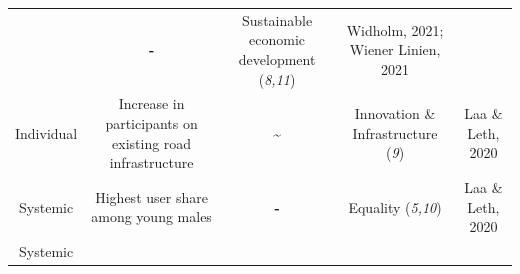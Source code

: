 \documentclass[
]{book}
\begin{document}
\begin{longtable}[]{@{}ccccc@{}}
\begin{minipage}[t]{0.16\columnwidth}
\end{minipage} & \begin{minipage}[t]{0.17\columnwidth}\centering
\textbf{-}\strut
\end{minipage} & \begin{minipage}[t]{0.17\columnwidth}\centering
Sustainable economic development (\emph{8,11})\strut
\end{minipage} & \begin{minipage}[t]{0.17\columnwidth}\centering
Widholm, 2021; Wiener Linien, 2021\strut
\end{minipage}\tabularnewline
\begin{minipage}[t]{0.17\columnwidth}\centering
Individual\strut
\end{minipage} & \begin{minipage}[t]{0.16\columnwidth}\centering
Increase in participants on existing road infrastructure\strut
\end{minipage} & \begin{minipage}[t]{0.17\columnwidth}\centering
\textbf{\textasciitilde{}}\strut
\end{minipage} & \begin{minipage}[t]{0.17\columnwidth}\centering
Innovation \& Infrastructure (\emph{9})\strut
\end{minipage} & \begin{minipage}[t]{0.17\columnwidth}\centering
Laa \& Leth, 2020\strut
\end{minipage}\tabularnewline
\begin{minipage}[t]{0.17\columnwidth}\centering
Systemic\strut
\end{minipage} & \begin{minipage}[t]{0.16\columnwidth}\centering
Highest user share among young males\strut
\end{minipage} & \begin{minipage}[t]{0.17\columnwidth}\centering
\textbf{-}\strut
\end{minipage} & \begin{minipage}[t]{0.17\columnwidth}\centering
Equality (\emph{5,10})\strut
\end{minipage} & \begin{minipage}[t]{0.17\columnwidth}\centering
Laa \& Leth, 2020\strut
\end{minipage}\tabularnewline
\begin{minipage}[t]{0.17\columnwidth}\centering
Systemic\strut
\end{minipage} & \begin{minipage}[t]{0.16\columnwidth}\centering

\end{minipage}
\end{longtable}
\end{document}
